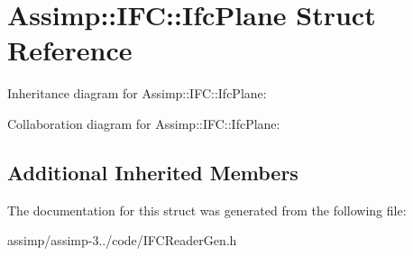 \hypertarget{struct_assimp_1_1_i_f_c_1_1_ifc_plane}{\section{Assimp\+:\+:I\+F\+C\+:\+:Ifc\+Plane Struct Reference}
\label{struct_assimp_1_1_i_f_c_1_1_ifc_plane}
}


Inheritance diagram for Assimp\+:\+:I\+F\+C\+:\+:Ifc\+Plane\+:


Collaboration diagram for Assimp\+:\+:I\+F\+C\+:\+:Ifc\+Plane\+:
\subsection*{Additional Inherited Members}


The documentation for this struct was generated from the following file\+:\begin{DoxyCompactItemize}
\item 
assimp/assimp-\/3../code/I\+F\+C\+Reader\+Gen.\+h\end{DoxyCompactItemize}
